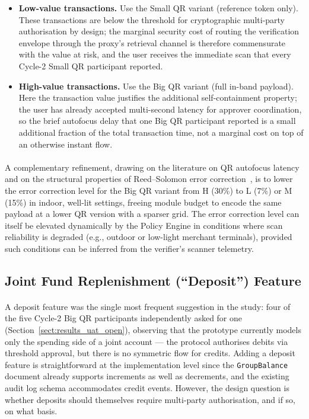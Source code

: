 \begin{itemize}
  \item \textbf{Low-value transactions.} Use the Small QR variant (reference token only). These transactions are below the threshold for cryptographic multi-party authorisation by design; the marginal security cost of routing the verification envelope through the proxy's retrieval channel is therefore commensurate with the value at risk, and the user receives the immediate scan that every Cycle-2 Small QR participant reported.
  \item \textbf{High-value transactions.} Use the Big QR variant (full in-band payload). Here the transaction value justifies the additional self-containment property; the user has already accepted multi-second latency for approver coordination, so the brief autofocus delay that one Big QR participant reported is a small additional fraction of the total transaction time, not a marginal cost on top of an otherwise instant flow.
\end{itemize}

\paragraph{}A complementary refinement, drawing on the literature on QR autofocus latency~\cite{corpuz2025} and on the structural properties of Reed--Solomon error correction~\cite{reed1960, bajaj2024}, is to lower the error correction level for the Big QR variant from H (30\%) to L (7\%) or M (15\%) in indoor, well-lit settings, freeing module budget to encode the same payload at a lower QR version with a sparser grid. The error correction level can itself be elevated dynamically by the Policy Engine in conditions where scan reliability is degraded (e.g., outdoor or low-light merchant terminals), provided such conditions can be inferred from the verifier's scanner telemetry.

\subsection{Joint Fund Replenishment (``Deposit'') Feature}
\label{sect:rec_deposit}

\paragraph{}A deposit feature was the single most frequent suggestion in the study: four of the five Cycle-2 Big QR participants independently asked for one (Section~\ref{sect:results_uat_open}), observing that the prototype currently models only the spending side of a joint account --- the protocol authorises debits via threshold approval, but there is no symmetric flow for credits. Adding a deposit feature is straightforward at the implementation level since the \texttt{GroupBalance} document already supports increments as well as decrements, and the existing audit log schema accommodates credit events. However, the design question is whether deposits should themselves require multi-party authorisation, and if so, on what basis.

